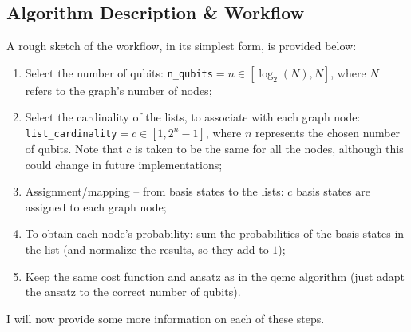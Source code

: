 \subsection{Algorithm Description \& Workflow}
\label{subsection:iQAQE Description_Workflow}
A rough sketch of the workflow, in its simplest form, is provided below:
\begin{enumerate}
    \item Select the number of qubits: \texttt{n\_qubits}$ = n \in \left[\log_2{(N)}, N\right]$, where $N$ refers to the graph's number of nodes;
    \item Select the cardinality of the lists, to associate with each graph node: \texttt{list\_cardinality}$ = c \in \left[1, 2^{n} - 1\right]$, where $n$ represents the chosen number of qubits. Note that $c$ is taken to be the same for all the nodes, although this could change in future implementations;
    \item Assignment/mapping – from basis states to the lists: $c$ basis states are assigned to each graph node;
    \item To obtain each node's probability: sum the probabilities of the basis states in the list (and normalize the results, so they add to $1$);
    \item Keep the same cost function and ansatz as in the \acrshort{qemc} algorithm (just adapt the ansatz to the correct number of qubits).
\end{enumerate}

I will now provide some more information on each of these steps.

